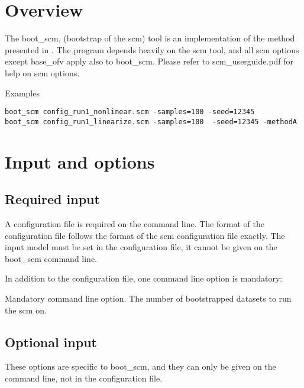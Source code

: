 



\maketitle

\newcommand{\guidetoolname}{boot\_scm}

\section{Overview}

The boot\_scm, (bootstrap of the scm) tool is an implementation of the method presented in \cite{Keizer2}.
The program depends heavily on the scm tool, and all scm options except base\_ofv apply also to boot\_scm. Please refer to scm\_userguide.pdf for help on scm options.

Examples
\begin{verbatim}
boot_scm config_run1_nonlinear.scm -samples=100 -seed=12345
boot_scm config_run1_linearize.scm -samples=100  -seed=12345 -methodA
\end{verbatim}

\section{Input and options}

\subsection{Required input}
A configuration file is required on the command line. The format of the configuration file follows the format of 
the scm configuration file exactly. 
The input model must be set in the configuration file, it cannot be given on the boot\_scm command line. 

In addition to the configuration file, one command line option is mandatory:
	
\begin{optionlist}
Mandatory command line option.
The number of bootstrapped datasets to run the scm on. 
\nextopt
\end{optionlist}

\subsection{Optional input}
These options are specific to boot\_scm, and they can only be given on the command line, not in the configuration file.

